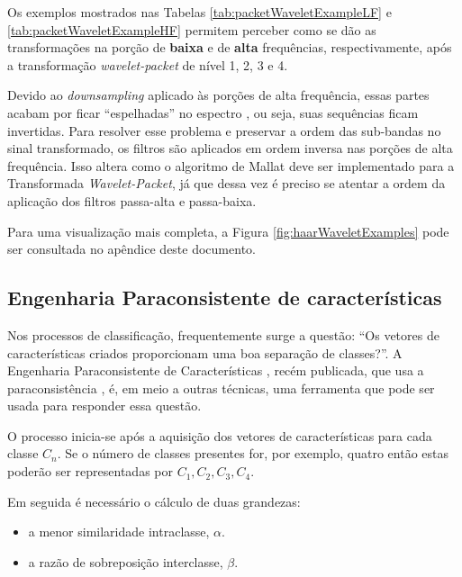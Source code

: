 			\par Os exemplos mostrados nas Tabelas \ref{tab:packetWaveletExampleLF} e \ref{tab:packetWaveletExampleHF} permitem perceber como se dão as transformações na porção de \textbf{baixa} e de \textbf{alta} frequências, respectivamente, após a transformação \textit{wavelet-packet} de nível 1, 2, 3 e 4.

			\par Devido ao \textit{downsampling} aplicado às porções de alta frequência, essas partes acabam por ficar ``espelhadas'' no espectro \cite{Jensen_2001}, ou seja, suas sequências ficam invertidas. Para resolver esse problema e preservar a ordem das sub-bandas no sinal transformado, os filtros são aplicados em ordem inversa nas porções de alta frequência. Isso altera como o algoritmo de Mallat deve ser implementado para a Transformada \textit{Wavelet-Packet}, já que dessa vez é preciso se atentar a ordem da aplicação dos filtros passa-alta e passa-baixa.

			
			
			\par Para uma visualização mais completa, a Figura \ref{fig:haarWaveletExamples} pode ser consultada no apêndice deste documento.
			
			\subsection{Engenharia Paraconsistente de características}
				\par Nos processos de classificação, frequentemente surge a questão: ``Os vetores de características criados proporcionam uma boa separação de classes?''. A Engenharia Paraconsistente de Características \cite{8588433}, recém publicada, que usa a paraconsistência \cite{da1998elementos},  \cite{COSTA2000} é, em meio a outras técnicas, uma ferramenta que pode ser usada para responder essa questão.
				
				\par O processo inicia-se após a aquisição dos vetores de características para cada classe $C_n$. Se o número de classes presentes for, por exemplo, quatro então estas poderão ser representadas por $C_1, C_2, C_3, C_4$.
				\par Em seguida é necessário o cálculo de duas grandezas:
				
				\begin{itemize}
					\item a menor similaridade intraclasse, $\alpha$.
					\item a razão de sobreposição interclasse, $\beta$.
				\end{itemize}
			
